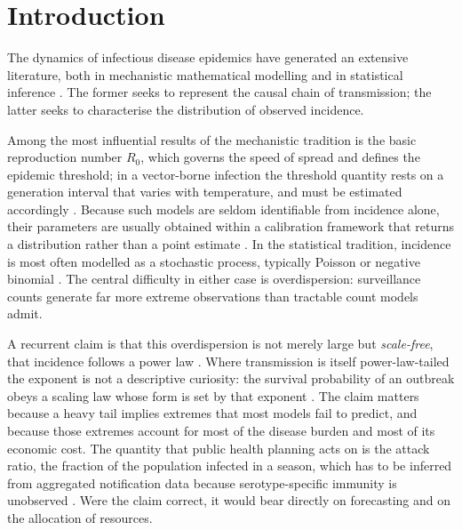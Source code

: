 \documentclass[english,10pt,b5paper]{article}
\begin{document}
\section{Introduction}

The dynamics of infectious disease epidemics have generated an extensive
literature, both in mechanistic mathematical modelling and in statistical
inference \citep{siettos2013mathematical}. The former seeks to represent the
causal chain of transmission; the latter seeks to characterise the distribution
of observed incidence.

Among the most influential results of the mechanistic tradition is the basic
reproduction number $R_0$, which governs the speed of spread and defines the
epidemic threshold; in a vector-borne infection the threshold quantity rests on a
generation interval that varies with temperature, and must be estimated
accordingly \citep{codeco2018rt}. Because such models are seldom identifiable
from incidence alone, their parameters are usually obtained within a calibration
framework that returns a distribution rather than a point estimate
\citep{coelho2011bayesian}. In the statistical tradition, incidence is most often
modelled as a stochastic process, typically Poisson or negative binomial
\citep{becker1999statistical, li2012log}. The central difficulty in either case
is overdispersion: surveillance counts generate far more extreme observations
than tractable count models admit.

A recurrent claim is that this overdispersion is not merely large but
\emph{scale-free}, that incidence follows a power law
\citep{rhodes1997critical, clauset2009power, neipel2020power}. Where transmission
is itself power-law-tailed the exponent is not a descriptive curiosity: the
survival probability of an outbreak obeys a scaling law whose form is set by that
exponent \citep{falco2022finite}. The claim matters because a heavy tail implies
extremes that most models fail to predict, and because those extremes account for
most of the disease burden and most of its economic cost. The quantity that public
health planning acts on is the attack ratio, the fraction of the population
infected in a season, which has to be inferred from aggregated notification data
because serotype-specific immunity is unobserved \citep{coelho2015attack}. Were
the claim correct, it would bear directly on forecasting and on the allocation of
resources.
\end{document}
